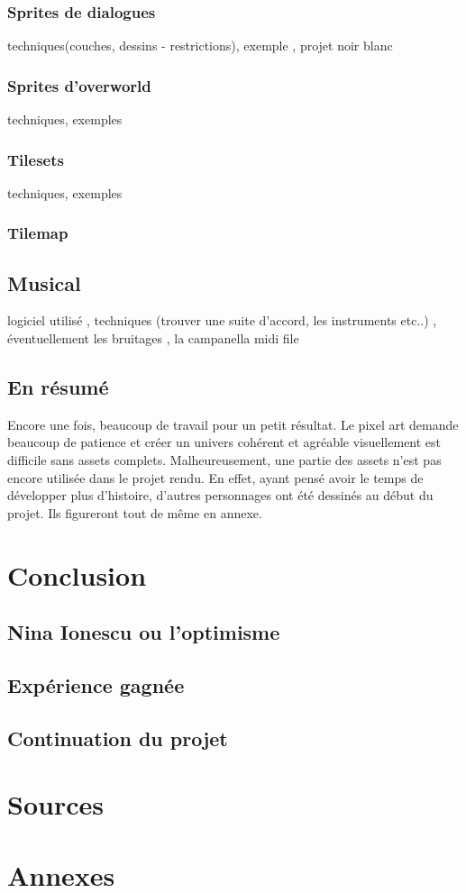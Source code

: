\documentclass[11pt]{article}
\begin{document}
\subsubsection{Sprites de dialogues}
techniques(couches, dessins - restrictions), exemple , projet noir blanc
\subsubsection{Sprites d'overworld}
techniques, exemples
\subsubsection{Tilesets}
techniques, exemples
\subsubsection{Tilemap}
\subsection{Musical}
logiciel utilisé , techniques (trouver une suite d'accord, les instruments etc..) , éventuellement les bruitages , la campanella midi file
\subsection{En résumé}
Encore une fois, beaucoup de travail pour un petit résultat. Le pixel art demande beaucoup de patience et créer un univers cohérent et agréable visuellement est difficile sans assets complets. Malheureusement, une partie des assets n'est pas encore utilisée dans le projet rendu. En effet, ayant pensé avoir le temps de développer plus d'histoire, d'autres personnages ont été dessinés au début du projet. Ils figureront tout de même en annexe.
\section{Conclusion}
\subsection{Nina Ionescu ou l'optimisme}
\subsection{Expérience gagnée}
\subsection{Continuation du projet}

\section{Sources}
\section{Annexes}%
\begin{lstlisting}[language=JavaScript]

\end{lstlisting} 
\end{document}

